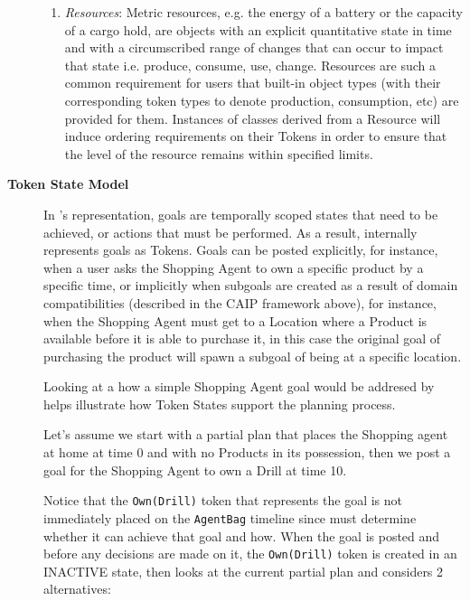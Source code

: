 \begin{description}
\begin{enumerate}
\item \textit{Resources}: Metric resources, e.g. the energy of a
  battery or the capacity of a cargo hold, are objects with an
  explicit quantitative state in time and with a circumscribed range
  of changes that can occur to impact that state i.e. produce,
  consume, use, change.  Resources are such a common requirement for
  \eu users that built-in object types (with their corresponding token
  types to denote production, consumption, etc) are provided for
  them. Instances of classes derived from a Resource will induce
  ordering requirements on their Tokens in order to ensure that the
  level of the resource remains within specified limits.  
\end{enumerate}

\item[\textbf{Token State Model}] In \eu's representation, goals are
  temporally scoped states that need to be achieved, or actions that
  must be performed. As a result, \eu internally represents goals as
  Tokens.  Goals can be posted explicitly, for instance, when a user
  asks the Shopping Agent to own a specific product by a specific
  time, or implicitly when subgoals are created as a result of domain
  compatibilities (described in the CAIP framework above), for
  instance, when the Shopping Agent must get to a Location where a
  Product is available before it is able to purchase it, in this case
  the original goal of purchasing the product will spawn a subgoal of
  being at a specific location.

  Looking at a how a simple Shopping Agent goal would be addresed by
  \eu helps illustrate how Token States support the planning process.

  Let's assume we start with a partial plan that places the Shopping
  agent at home at time 0 and with no Products in its possession, then
  we post a goal for the Shopping Agent to own a Drill at time 10.


Notice that the \texttt{Own(Drill)} token that represents the goal is
not immediately placed on the \texttt{AgentBag} timeline since \eu
must determine whether it can achieve that goal and how. When the goal
is posted and before any decisions are made on it, the
\texttt{Own(Drill)} token is created in an INACTIVE state, then \eu
looks at the current partial plan and considers 2 alternatives:


\end{description}
